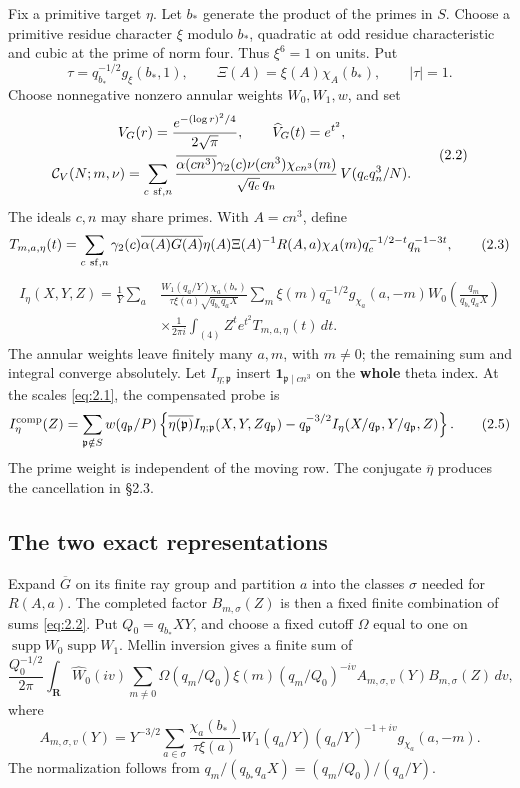 \documentclass[11pt,a4paper]{article}
\begin{document}
Fix a primitive target \(\eta\). Let \(b_*\) generate the product of the primes in \(S\). Choose a primitive residue character \(\xi\) modulo \(b_*\), quadratic at odd residue characteristic and cubic at the prime of norm four. Thus \(\xi^6=1\) on units. Put \[
 \tau=q_{b_*}^{-1/2}g_\xi(b_*,1),\qquad
 \Xi(A)=\xi(A)\chi_A(b_*),\qquad |\tau|=1.
\] Choose nonnegative nonzero annular weights \(W_0,W_1,w\), and set \[
\begin{gathered}
 V_G(r)=\frac{e^{-(\log r)^2/4}}{2\sqrt\pi},\qquad \widehat V_G(t)=e^{t^2},\\
 \mathcal C_V(N;m,\nu)=\sum_{c\ {\rm sf},n}
 \frac{\overline{\alpha(cn^3)}\gamma_2(c)\nu(cn^3)\chi_{cn^3}(m)}
 {\sqrt{q_c}\,q_n}\,V(q_cq_n^3/N).
\end{gathered}
\tag{2.2}\label{eq:2.2}
\] The ideals \(c,n\) may share primes. With \(A=cn^3\), define \[
 T_{m,a,\eta}(t)=\sum_{c\ {\rm sf},n}
 \gamma_2(c)\overline{\alpha(A)G(A)}\eta(A)\Xi(A)^{-1}R(A,a)
 \chi_A(m)q_c^{-1/2-t}q_n^{-1-3t},
\tag{2.3}\label{eq:2.3}
\] \[
\begin{aligned}
 I_\eta(X,Y,Z)=\frac1Y\sum_a
 &\frac{W_1(q_a/Y)\chi_a(b_*)}{\tau\xi(a)\sqrt{q_{b_*}q_aX}}
 \sum_m\xi(m)q_a^{-1/2}g_{\chi_a}(a,-m)
 W_0\!\left(\frac{q_m}{q_{b_*}q_aX}\right)\\
 &\times\frac1{2\pi i}\int_{(4)}Z^te^{t^2}T_{m,a,\eta}(t)\,dt.
\end{aligned}
\tag{2.4}\label{eq:2.4}
\] The annular weights leave finitely many \(a,m\), with \(m\ne0\); the remaining sum and integral converge absolutely. Let \(I_{\eta;\mathfrak p}\) insert \(\mathbf1_{\mathfrak p\mid cn^3}\) on the \textbf{whole} theta index. At the scales \eqref{eq:2.1}, the compensated probe is \[
 I_\eta^{\rm comp}(Z)=\sum_{\mathfrak p\notin S}w(q_{\mathfrak p}/P)
 \left\{\overline{\eta(\mathfrak p)}I_{\eta;\mathfrak p}(X,Y,Zq_{\mathfrak p})
 -q_{\mathfrak p}^{-3/2}I_\eta(X/q_{\mathfrak p},Y/q_{\mathfrak p},Z)\right\}.
\tag{2.5}\label{eq:2.5}
\] The prime weight is independent of the moving row. The conjugate \(\overline\eta\) produces the cancellation in §2.3.

\subsection{The two exact representations}\label{sec:2.2}

Expand \(\overline G\) on its finite ray group and partition \(a\) into the classes \(\sigma\) needed for \(R(A,a)\). The completed factor \(B_{m,\sigma}(Z)\) is then a fixed finite combination of sums \eqref{eq:2.2}. Put \(Q_0=q_{b_*}XY\), and choose a fixed cutoff \(\Omega\) equal to one on \(\operatorname{supp}W_0\operatorname{supp}W_1\). Mellin inversion gives a finite sum of \[
 \frac{Q_0^{-1/2}}{2\pi}\int_{\mathbf R}\widehat W_0(iv)
 \sum_{m\ne0}\Omega(q_m/Q_0)\xi(m)(q_m/Q_0)^{-iv}
 A_{m,\sigma,v}(Y)B_{m,\sigma}(Z)\,dv,
\tag{2.6}\label{eq:2.6}
\] where \[
 A_{m,\sigma,v}(Y)=Y^{-3/2}\sum_{a\in\sigma}
 \frac{\chi_a(b_*)}{\tau\xi(a)}W_1(q_a/Y)(q_a/Y)^{-1+iv}g_{\chi_a}(a,-m).
\tag{2.7}\label{eq:2.7}
\] The normalization follows from \(q_m/(q_{b_*}q_aX)=(q_m/Q_0)/(q_a/Y)\).
\end{document}
